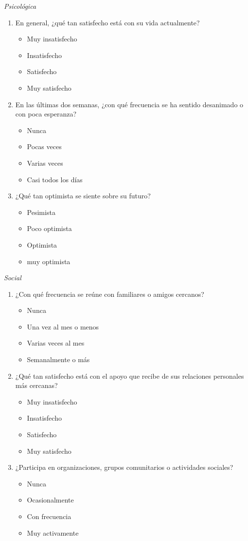 \documentclass{article}
\begin{document}
\textit{Psicológica}
\begin{enumerate}
	\item En general, ¿qué tan satisfecho está con su vida actualmente?
	\begin{itemize}
		\item Muy insatisfecho
		\item Insatisfecho
		\item Satisfecho
		\item Muy satisfecho
	\end{itemize}
	\item En las últimas dos semanas, ¿con qué frecuencia se ha sentido desanimado o con poca esperanza?
	\begin{itemize}
		\item Nunca
		\item Pocas veces
		\item Varias veces
		\item Casi todos los días
	\end{itemize}
	\item ¿Qué tan optimista se siente sobre su futuro?
	\begin{itemize}
		\item Pesimista
		\item Poco optimista
		\item Optimista
		\item muy optimista
	\end{itemize}
\end{enumerate}
\textit{Social}
\begin{enumerate}
	\item ¿Con qué frecuencia se reúne con familiares o amigos cercanos?
	\begin{itemize}
		\item Nunca
		\item Una vez al mes o menos
		\item Varias veces al mes
		\item Semanalmente o más
	\end{itemize}
	\item ¿Qué tan satisfecho está con el apoyo que recibe de sus relaciones personales más cercanas?
	\begin{itemize}
		\item Muy insatisfecho
		\item Insatisfecho
		\item Satisfecho
		\item Muy satisfecho
	\end{itemize}
	\item ¿Participa en organizaciones, grupos comunitarios o actividades sociales?
	\begin{itemize}
		\item Nunca
		\item Ocasionalmente
		\item Con frecuencia
		\item Muy activamente
	\end{itemize}
\end{enumerate}


\end{document}
